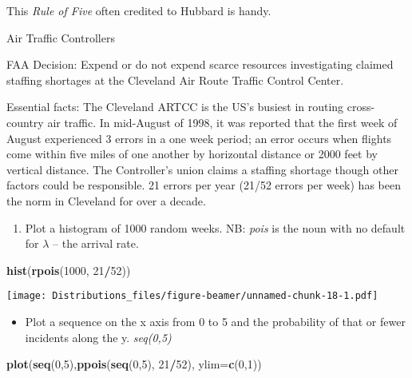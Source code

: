\documentclass[ignorenonframetext,]{beamer}
\newenvironment{Shaded}{\begin{snugshade}}{\end{snugshade}}
\newcommand{\DataTypeTok}[1]{\textcolor[rgb]{0.13,0.29,0.53}{#1}}
\newcommand{\DecValTok}[1]{\textcolor[rgb]{0.00,0.00,0.81}{#1}}
\newcommand{\KeywordTok}[1]{\textcolor[rgb]{0.13,0.29,0.53}{\textbf{#1}}}
\newcommand{\NormalTok}[1]{#1}
\newcommand{\OperatorTok}[1]{\textcolor[rgb]{0.81,0.36,0.00}{\textbf{#1}}}
\providecommand{\tightlist}{%
  \setlength{\itemsep}{0pt}\setlength{\parskip}{0pt}}
\begin{document}
This \emph{Rule of Five} often credited to Hubbard is handy.

\begin{frame}[fragile]{Air Traffic Controllers}
\protect\hypertarget{air-traffic-controllers}{}

FAA Decision: Expend or do not expend scarce resources investigating
claimed staffing shortages at the Cleveland Air Route Traffic Control
Center.

Essential facts: The Cleveland ARTCC is the US's busiest in routing
cross-country air traffic. In mid-August of 1998, it was reported that
the first week of August experienced 3 errors in a one week period; an
error occurs when flights come within five miles of one another by
horizontal distance or 2000 feet by vertical distance. The Controller's
union claims a staffing shortage though other factors could be
responsible. 21 errors per year (21/52 errors per week) has been the
norm in Cleveland for over a decade.

\begin{enumerate}[<+->]
\tightlist
\item
  Plot a histogram of 1000 random weeks. NB: \emph{pois} is the noun
  with no default for \(\lambda\) -- the arrival rate.
\end{enumerate}

\begin{Shaded}
\begin{Highlighting}[]
\KeywordTok{hist}\NormalTok{(}\KeywordTok{rpois}\NormalTok{(}\DecValTok{1000}\NormalTok{, }\DecValTok{21}\OperatorTok{/}\DecValTok{52}\NormalTok{))}
\end{Highlighting}
\end{Shaded}

\texttt{[image: Distributions\_files/figure-beamer/unnamed-chunk-18-1.pdf]}

\begin{itemize}[<+->]
\tightlist
\item
  Plot a sequence on the x axis from 0 to 5 and the probability of that
  or fewer incidents along the y. \emph{seq(0,5)}
\end{itemize}

\begin{Shaded}
\begin{Highlighting}[]
\KeywordTok{plot}\NormalTok{(}\KeywordTok{seq}\NormalTok{(}\DecValTok{0}\NormalTok{,}\DecValTok{5}\NormalTok{),}\KeywordTok{ppois}\NormalTok{(}\KeywordTok{seq}\NormalTok{(}\DecValTok{0}\NormalTok{,}\DecValTok{5}\NormalTok{), }\DecValTok{21}\OperatorTok{/}\DecValTok{52}\NormalTok{), }\DataTypeTok{ylim=}\KeywordTok{c}\NormalTok{(}\DecValTok{0}\NormalTok{,}\DecValTok{1}\NormalTok{))}
\end{Highlighting}
\end{Shaded}


\end{frame}
\end{document}
